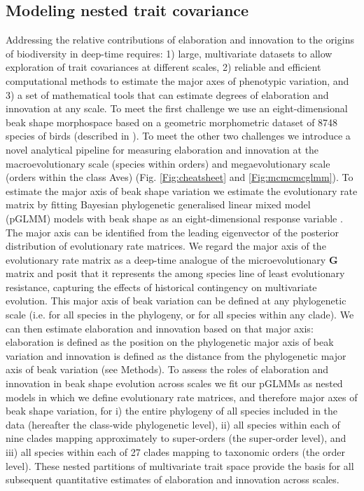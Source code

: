 \documentclass[12pt,letterpaper]{article}
\begin{document}
\subsection{Modeling nested trait covariance}
Addressing the relative contributions of elaboration and innovation to the origins of biodiversity in deep-time requires: 1) large, multivariate datasets to allow exploration of trait covariances at different scales, 2) reliable and efficient computational methods to estimate the major axes of phenotypic variation, and 3) a set of mathematical tools that can estimate degrees of elaboration and innovation at any scale.
To meet the first challenge we use an eight-dimensional beak shape morphospace based on a geometric morphometric dataset of 8748 species of birds (described in \cite{hughes2022global}).
To meet the other two challenges we introduce a novel analytical pipeline for measuring elaboration and innovation at the macroevolutionary scale (species within orders) and megaevolutionary scale (orders within the class Aves) (Fig.
 \ref{Fig:cheatsheet} and \ref{Fig:mcmcmcglmm}).
To estimate the major axis of beak shape variation we estimate the evolutionary rate matrix \cite{Houle2017,Machado2020} by fitting Bayesian phylogenetic generalised linear mixed model (pGLMM) models with beak shape as an eight-dimensional response variable \cite{MCMCglmm}.
The major axis can be identified from the leading eigenvector of the posterior distribution of evolutionary rate matrices.
We regard the major axis of the evolutionary rate matrix as a deep-time analogue of the microevolutionary \textbf{G} matrix \cite{robinson2013quantifying} and posit that it represents the among species line of least evolutionary resistance, capturing the effects of historical contingency on multivariate evolution.
This major axis of beak variation can be defined at any phylogenetic scale (i.e. for all species in the phylogeny, or for all species within any clade).
We can then estimate elaboration and innovation based on that major axis: elaboration is defined as the position on the phylogenetic major axis of beak variation and innovation is defined as the distance from the phylogenetic major axis of beak variation (see Methods). %
To assess the roles of elaboration and innovation in beak shape evolution across scales we fit our pGLMMs as nested models in which we define evolutionary rate matrices, and therefore major axes of beak shape variation, for
i) the entire phylogeny of all species included in the data (hereafter the class-wide phylogenetic level),
ii) all species within each of nine clades mapping approximately to super-orders (the super-order level), and
iii) all species within each of 27 clades mapping to taxonomic orders (the order level).
These nested partitions of multivariate trait space provide the basis for all subsequent quantitative estimates of elaboration and innovation across scales.
\end{document}
